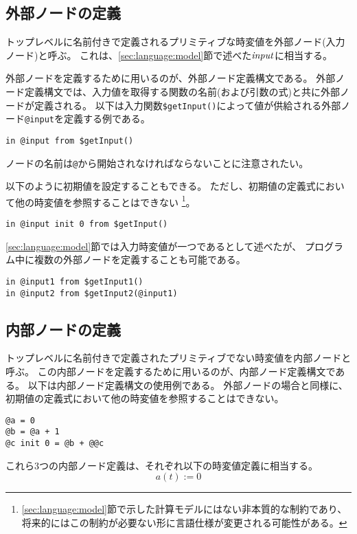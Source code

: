 \subsection{外部ノードの定義}
トップレベルに名前付きで定義されるプリミティブな時変値を外部ノード(入力ノード)と呼ぶ。
これは、\ref{sec:language:model}節で述べた${\it input}$に相当する。

外部ノードを定義するために用いるのが、外部ノード定義構文である。
外部ノード定義構文では、入力値を取得する関数の名前(および引数の式)と共に外部ノードが定義される。
以下は入力関数\texttt{\$getInput()}によって値が供給される外部ノード\texttt{@input}を定義する例である。
\begin{lstlisting}[basicstyle=\ttfamily\small,language=SFRP]
in @input from $getInput()
\end{lstlisting}
ノードの名前は\texttt{@}から開始されなければならないことに注意されたい。

以下のように初期値を設定することもできる。
ただし、初期値の定義式において他の時変値を参照することはできない
\footnote[1]{
\ref{sec:language:model}節で示した計算モデルにはない非本質的な制約であり、
将来的にはこの制約が必要ない形に言語仕様が変更される可能性がある。
}。
\begin{lstlisting}[basicstyle=\ttfamily\small,language=SFRP]
in @input init 0 from $getInput()
\end{lstlisting}

\ref{sec:language:model}節では入力時変値が一つであるとして述べたが、
プログラム中に複数の外部ノードを定義することも可能である。
\begin{lstlisting}[basicstyle=\ttfamily\small,language=SFRP]
in @input1 from $getInput1()
in @input2 from $getInput2(@input1)
\end{lstlisting}

\subsection{内部ノードの定義}
トップレベルに名前付きで定義されたプリミティブでない時変値を内部ノードと呼ぶ。
この内部ノードを定義するために用いるのが、内部ノード定義構文である。
以下は内部ノード定義構文の使用例である。
外部ノードの場合と同様に、初期値の定義式において他の時変値を参照することはできない。
\begin{lstlisting}[basicstyle=\ttfamily\small,language=SFRP]
@a = 0
@b = @a + 1
@c init 0 = @b + @@c
\end{lstlisting}

これら3つの内部ノード定義は、それぞれ以下の時変値定義に相当する。
\begin{equation*}
  a(t) := 0
\end{equation*}

